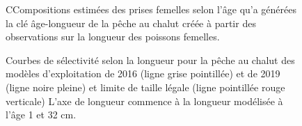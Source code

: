 \documentclass[11pt]{book}
\begin{document}
\newpage
\begin{figure}[htb]

{\centering {} 

}

\caption{CCompositions estimées des prises femelles selon l’âge qu’a générées la clé âge-longueur de la pêche au chalut créée à partir des observations sur la longueur des poissons femelles.}\label{fig:unnamed-chunk-33}
\end{figure}
\newpage
\begin{figure}[htb]

{\centering {} 

}

\caption{Courbes de sélectivité selon la longueur pour la pêche au chalut des modèles d’exploitation de 2016 (ligne grise pointillée) et de 2019 (ligne noire pleine) et limite de taille légale (ligne pointillée rouge verticale) L’axe de longueur commence à la longueur modélisée à l’âge 1 et 32 cm.}\label{fig:unnamed-chunk-34}
\end{figure}
\clearpage
\end{document}
